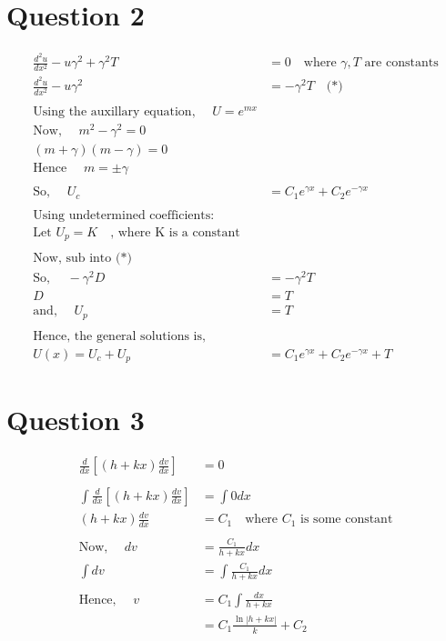 \documentclass[letterpaper,12pt,titlepage,oneside,final]{book}
\begin{document}
\section*{Question 2}
\begin{align*}
\frac{d^2u}{dx^2} - u\gamma^2 + \gamma^2 T &= 0\quad \text{where $\gamma, T$ are constants}\\
\frac{d^2u}{dx^2} - u\gamma^2 &= - \gamma^2 T \quad \text{(*)}\\
\\
\text{Using the auxillary equation, }\quad U = e^{mx}\\
\text{Now, }\quad m^2 - \gamma^2 = 0\\
(m + \gamma)(m - \gamma)=0\\
\text{Hence }\quad m = \pm \gamma\\
\\
\text{So, }\quad U_c &= C_1 e^{\gamma x} + C_2e^{-\gamma x}\\
\\
\text{Using undetermined coefficients: }\\
\text{Let $U_p = K \quad$, where K is a constant}\\
\\
\text{Now, sub into (*)}\\
\text{So, }\quad -\gamma^2 D &= -\gamma^2 T\\
D &= T\\
\text{and, }\quad U_p &= T\\
\\
\text{Hence, the general solutions is, }\quad \\
U(x) = U_c + U_p &= C_1 e^{\gamma x} + C_2e^{-\gamma x} + T
\end{align*}

\clearpage 


\section*{Question 3}
\begin{align*}
\frac{d}{dx}\left[(h + k x) \frac{dv}{dx} \right] &= 0\\
\\
\int \frac{d}{dx}\left[(h + k x) \frac{dv}{dx} \right] &= \int 0 dx \\
(h + k x) \frac{dv}{dx} & = C_1 \quad \text{where $C_1$ is some constant}\\
\\
\text{Now, }\quad  dv &= \frac{C_1}{h + k x}dx\\
\int dv &= \int \frac{C_1}{h + k x}dx\\
\\
\text{Hence, }\quad v &= C_1 \int \frac{dx}{h + k x}\\
& = C_1 \frac{\ln |h + kx|}{k} + C_2\\
\end{align*}
\end{document}
